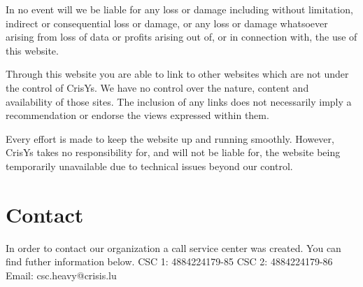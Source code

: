 In no event will we be liable for any loss or damage including without limitation, 
indirect or consequential loss or damage, or any loss or damage whatsoever arising 
from loss of data or profits arising out of, or in connection with, the use of this 
website.

Through this website you are able to link to other websites which are not under 
the control of CrisYs. We have no control over the nature, content and 
availability of those sites. The inclusion of any links does not necessarily imply 
a recommendation or endorse the views expressed within them.

Every effort is made to keep the website up and running smoothly. However, 
CrisYs takes no responsibility for, and will not be liable for, the website 
being temporarily unavailable due to technical issues beyond our control.

\section{Contact}
In order to contact our organization a call service center was created.
You can find futher information below.
CSC 1:  4884224179-85 
CSC 2:  4884224179-86 
Email: csc.heavy@crisis.lu

